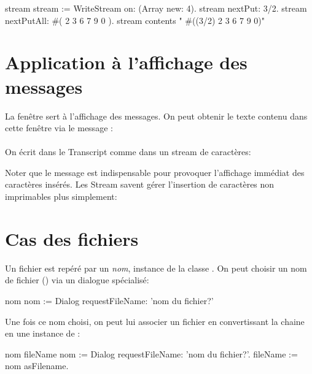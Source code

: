 \begin{scode}
\stBar  stream \stBar
stream := WriteStream on: (Array new: 4).
stream nextPut: 3/2.
stream nextPutAll: #( 2  3 6 7 9 0 ).
stream contents	" #((3/2) 2 3 6 7 9 0)" 
\end{scode}

\section{Application \`a l'affichage des messages}

La fen\^etre  sert \`a l'affichage des messages.
On peut obtenir le texte contenu dans cette fen\^etre via le
message :\\
 \\

On \'ecrit dans le Transcript comme dans un stream de caract\`eres:\\

Noter que le message  est indispensable pour provoquer
l'affichage imm\'ediat des caract\`eres ins\'er\'es.
Les Stream savent g\'erer l'insertion de caract\`eres non imprimables
plus simplement:\\

\section{Cas des fichiers}

Un fichier est rep\'er\'e par un {\sl nom}, instance de la classe
. On peut choisir un nom de  fichier ()
via un dialogue sp\'ecialis\'e:\\
\begin{scode}
\stBar nom \stBar
nom :=  Dialog requestFileName: 'nom du fichier?'
\end{scode}

Une fois ce nom choisi, on peut lui associer un fichier en 
convertissant la chaine en une instance de :\\
\begin{scode}
\stBar nom  fileName \stBar
nom :=  Dialog requestFileName: 'nom du fichier?'.
fileName := nom asFilename.
\end{scode}


